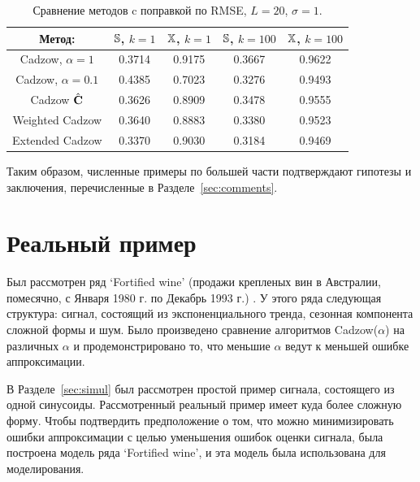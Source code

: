 \documentclass[12pt, specialist, subf,href,colorlinks=true,substylefile = spbu.rtx]{disser}
\theoremstyle{remark}
\theoremstyle{definition}
\begin{document}
\begin{table}[!hhh]
	\begin{center}
		\caption{Сравнение методов c поправкой по RMSE, $L = 20$, $\sigma=1$.}\label{fintable_improved}
		\begin{tabular}{|c|c|c|c|c|}
			\hline
			Метод: & $\mathbb{S}$, $k = 1$ & $\mathbb{X}$, $k = 1$ & $\mathbb{S}$, $k = 100$ & $\mathbb{X}$, $k = 100$  \\
			\hline
			Cadzow, $\alpha = 1$ & 0.3714 & 0.9175 & 0.3667 & 0.9622 \\
			\hline
			Cadzow, $\alpha = 0.1$ & 0.4385 & 0.7023 & 0.3276 & 0.9493 \\
			\hline
			Cadzow $\hat{\mathbf{C}}$ & 0.3626 & 0.8909 & 0.3478 & 0.9555 \\
			\hline
			Weighted Cadzow & 0.3640 & 0.8883 & 0.3380 & 0.9523 \\
			\hline
			Extended Cadzow & 0.3370 & 0.9030 & 0.3184 & 0.9469 \\
			\hline
		\end{tabular}
	\end{center}
\end{table}

Таким образом, численные примеры по большей части подтверждают гипотезы и заключения, перечисленные в Разделе~\ref{sec:comments}.

\section{Реальный пример}
\label{sec:ex_real}
Был рассмотрен ряд `Fortified wine' (продажи крепленых вин в Австралии, помесячно, с Января 1980 г. по Декабрь 1993 г.) \citep{HyndmanTSDL}. У этого ряда следующая структура: сигнал, состоящий из экспоненциального тренда, сезонная компонента сложной формы и шум.
Было произведено сравнение алгоритмов Cadzow($\alpha$) на различных $\alpha$ и продемонстрировано то, что меньшие $\alpha$ ведут к меньшей ошибке аппроксимации.

В Разделе~\ref{sec:simul} был рассмотрен простой пример сигнала, состоящего из одной синусоиды.
Рассмотренный реальный пример имеет куда более сложную форму. Чтобы подтвердить предположение о том, что можно минимизировать ошибки аппроксимации с целью уменьшения ошибок оценки сигнала,
была построена модель ряда `Fortified wine', и эта модель была использована для моделирования.
\end{document}
